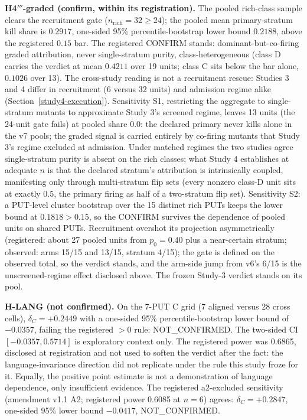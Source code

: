 \documentclass[manuscript,screen,review]{acmart}
\begin{document}
\textbf{H4\('''\)-graded (confirm, within its registration).} The pooled
rich-class sample clears the recruitment gate
(\(n_{\mathrm{rich}} = 32 \geq 24\)); the pooled mean primary-stratum kill
share is \(0.2917\), one-sided 95\% percentile-bootstrap lower bound
\(0.2188\), above the registered \(0.15\) bar. The registered CONFIRM stands:
dominant-but-co-firing graded attribution, never single-stratum purity,
class-heterogeneous (class D carries the verdict at mean \(0.4211\) over 19
units; class C sits below the bar alone, \(0.1026\) over 13). The cross-study
reading is not a recruitment rescue: Studies 3 and 4 differ in recruitment
(6 versus 32 units) and admission regime alike
(Section~\ref{study4-execution}). Sensitivity S1, restricting the aggregate
to single-stratum mutants to approximate Study 3's screened regime, leaves 13
units (the 24-unit gate fails) at pooled share \(0.0\): the declared primary
never kills alone in the v7 pools; the graded signal is carried entirely by
co-firing mutants that Study 3's regime excluded at admission. Under matched
regimes the two studies agree single-stratum purity is absent on the rich
classes; what Study 4 establishes at adequate \(n\) is that the declared
stratum's attribution is intrinsically coupled, manifesting only through
multi-stratum flip sets (every nonzero class-D unit sits at exactly \(0.5\),
the primary firing as half of a two-stratum flip set). Sensitivity S2: a
PUT-level cluster bootstrap over the 15 distinct rich PUTs keeps the lower
bound at \(0.1818 > 0.15\), so the CONFIRM survives the dependence of pooled
units on shared PUTs. Recruitment overshot its projection asymmetrically
(registered: about 27 pooled units from \(p_0 = 0.40\) plus a near-certain
stratum; observed: arms 15/15 and 13/15, stratum 4/15); the gate is defined
on the observed total, so the verdict stands, and the arm-side jump from v6's
6/15 is the unscreened-regime effect disclosed above. The frozen Study-3
verdict stands on its pool.

\textbf{H-LANG (not confirmed).} On the 7-PUT C grid (7 aligned versus 28
cross cells), \(\delta_C = +0.2449\) with a one-sided 95\%
percentile-bootstrap lower bound of \(-0.0357\), failing the registered
\(> 0\) rule: NOT\_CONFIRMED. The two-sided CI \([-0.0357, 0.5714]\) is
exploratory context only. The registered power was 0.6865, disclosed at
registration and not used to soften the verdict after the fact: the
language-invariance direction did not replicate under the rule this study
froze for it. Equally, the positive point estimate is not a demonstration of
language dependence, only insufficient evidence. The registered a2-excluded
sensitivity (amendment v1.1
A2; registered power 0.6085 at \(n = 6\)) agrees: \(\delta_C = +0.2847\),
one-sided 95\% lower bound \(-0.0417\), NOT\_CONFIRMED.
\end{document}
